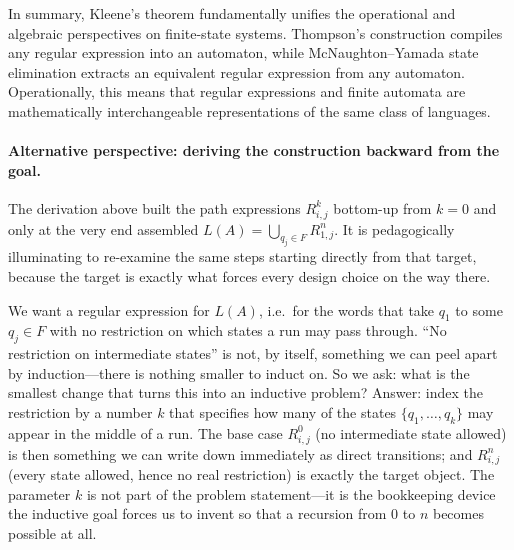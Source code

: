 \medskip\noindent
In summary, Kleene's theorem fundamentally unifies the operational and algebraic perspectives on finite-state systems. Thompson's construction compiles any regular expression into an automaton, while McNaughton--Yamada state elimination extracts an equivalent regular expression from any automaton. Operationally, this means that regular expressions and finite automata are mathematically interchangeable representations of the same class of languages.

\paragraph{Alternative perspective: deriving the construction backward from the goal.}
The derivation above built the path expressions $R_{i,j}^k$ bottom-up from $k=0$ and only at the very end assembled $L(A)=\bigcup_{q_j\in F}R_{1,j}^n$. It is pedagogically illuminating to re-examine the same steps starting directly from that target, because the target is exactly what forces every design choice on the way there.

We want a regular expression for $L(A)$, i.e.\ for the words that take $q_1$ to some $q_j\in F$ with no restriction on which states a run may pass through. ``No restriction on intermediate states'' is not, by itself, something we can peel apart by induction---there is nothing smaller to induct on. So we ask: what is the smallest change that turns this into an inductive problem? Answer: index the restriction by a number $k$ that specifies how many of the states $\{q_1,\ldots,q_k\}$ may appear in the middle of a run. The base case $R_{i,j}^0$ (no intermediate state allowed) is then something we can write down immediately as direct transitions; and $R_{i,j}^n$ (every state allowed, hence no real restriction) is exactly the target object. The parameter $k$ is not part of the problem statement---it is the bookkeeping device the inductive goal forces us to invent so that a recursion from $0$ to $n$ becomes possible at all.

